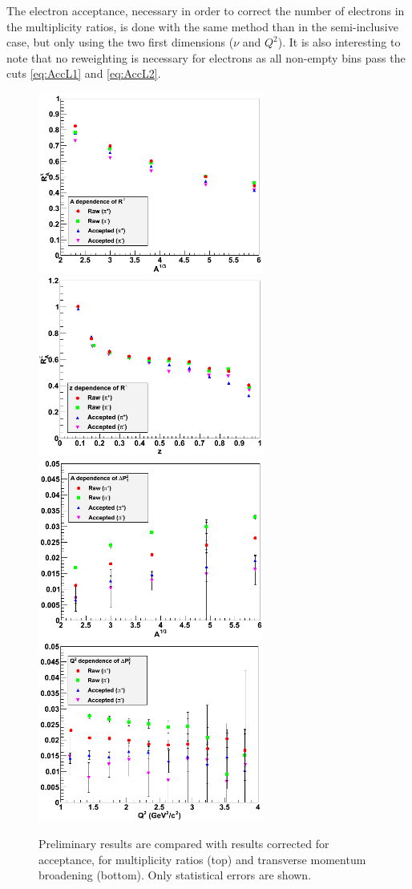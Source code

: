 The electron acceptance, necessary in order to correct the number of electrons 
in the multiplicity ratios, is done with the same method than in the 
semi-inclusive case, but only using the two first dimensions ($\nu$ 
and $Q^2$). It is also interesting to note that no reweighting is necessary 
for electrons as all non-empty bins pass the cuts \ref{eq:AccL1} and 
\ref{eq:AccL2}.

\begin{figure}[tbp]
\centering
\includegraphics[width=7.4cm] {chap5-fig/b_RvA.png} 
\includegraphics[width=7.4cm] {chap5-fig/b_RvZ.png} 
\includegraphics[width=7.4cm] {chap5-fig/b_PvA.png} 
\includegraphics[width=7.4cm] {chap5-fig/b_PvQ2.png} 
\caption {Preliminary results are compared with results corrected for 
acceptance, for multiplicity ratios (top) and transverse momentum broadening 
(bottom). Only statistical errors are shown.}
\label{fig:AcceptPlots}
\end{figure}


